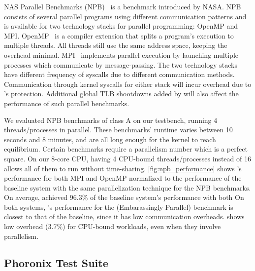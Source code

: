 \documentclass[letterpaper,twocolumn,10pt, anonymous]{article}
\begin{document}
NAS Parallel Benchmarks (NPB)~\cite{npb} is a benchmark introduced by
NASA. 
NPB consists of several parallel programs using different communication
patterns and is available for two technology stacks for parallel programming:
OpenMP and MPI.
OpenMP~\cite{dagum1998openmp} is a compiler extension that splits a 
program's execution to multiple threads. 
All threads still use the same address space, keeping the overhead minimal. 
MPI~\cite{snir1998mpi} implements parallel execution by launching multiple
processes which communicate by message-passing. 
The two technology stacks have different frequency of syscalls due to 
different communication methods.
Communication through kernel syscalls for either stack will incur overhead
due to \tiktok's protection.
Additional global TLB shootdowns added by \tiktok will also affect the 
performance of such parallel benchmarks.

We evaluated NPB benchmarks of class A on our testbench, running 
4 threads/processes in parallel.
These benchmarks' runtime varies between 10 seconds and 8 minutes, 
and are all long enough for the kernel to reach equilibrium.
Certain benchmarks require a parallelism number which is a perfect square.
On our 8-core CPU, having 4 CPU-bound threads/processes instead of 16 allows 
all of them to run without time-sharing.
\autoref{fig:npb_performance} shows \tiktok's performance for both MPI and OpenMP 
normalized to the performance of the baseline system with the same parallelization
technique for the NPB benchmarks.
On average, \tiktok achieved $96.3\%$ of the baseline system's performance with 
both 
On both systems, \tiktok's performance for the  (Embarassingly Parallel)
benchmark is closest to that of the baseline, since it has low 
communication overheads.
\tiktok shows low overhead ($3.7\%$) for CPU-bound workloads, even when they 
involve parallelism.

\subsection{Phoronix Test Suite}
\end{document}
